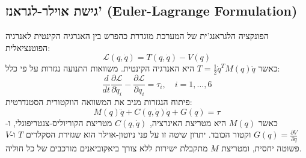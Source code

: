 \documentclass[11pt,a4paper]{article}
\begin{document}
\subsection{גישת אוילר-לגראנז' (\textenglish{Euler-Lagrange Formulation})}
הפונקציה הלגראנג'ית של המערכת מוגדרת כהפרש בין האנרגיה הקינטית לאנרגיה הפוטנציאלית:
\begin{equation}
\mathcal{L}(q, \dot{q}) = T(q, \dot{q}) - V(q)
\end{equation}
כאשר $T = \frac{1}{2}\dot{q}^T M(q)\dot{q}$ היא האנרגיה הקינטית. משוואות התנועה נגזרות על פי כלל:
\begin{equation}
\frac{d}{dt}\frac{\partial \mathcal{L}}{\partial \dot{q}_i} - \frac{\partial \mathcal{L}}{\partial q_i} = \tau_i, \quad i = 1,\ldots,6
\end{equation}
פיתוח הנגזרות מניב את המשוואה הווקטורית הסטנדרטית:
\begin{equation}
M(q)\ddot{q} + C(q,\dot{q})\dot{q} + G(q) = \tau
\label{eq:eom}
\end{equation}
כאשר $M(q)$ היא מטריצת האינרציה, $C(q,\dot{q})$ מטריצת הקוריוליס-צנטריפוגלי, ו-$G(q) = \frac{\partial V}{\partial q}$ וקטור הכובד. יתרון שיטה זו על פני ניוטון-אוילר הוא שגזירת הסקלרים $T$ ו-$V$ פשוטה יחסית, ומטריצת $M$ מתקבלת ישירות ללא צורך ביאקוביאנים מורכבים של כל חוליה.
\end{document}
